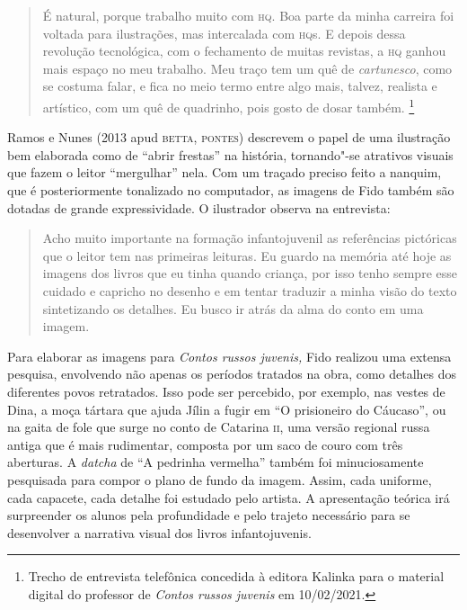 \documentclass[11pt]{extarticle}
\begin{document}
\begin{quote}
É natural, porque trabalho muito com \textsc{hq}. Boa parte da minha carreira foi
voltada para ilustrações, mas intercalada com \textsc{hq}s. E depois dessa
revolução tecnológica, com o fechamento de muitas revistas, a \textsc{hq} ganhou
mais espaço no meu trabalho. Meu traço tem um quê de \emph{cartunesco},
como se costuma falar, e fica no meio termo entre algo mais, talvez,
realista e artístico, com um quê de quadrinho, pois gosto de dosar
também. \footnote{Trecho de entrevista telefônica concedida à editora Kalinka para o material digital do professor de \emph{Contos russos juvenis} em 10/02/2021.} \end{quote}

Ramos e Nunes (2013 apud \textsc{betta}, \textsc{pontes}) descrevem o papel de uma
ilustração bem elaborada como de ``abrir frestas'' na história,
tornando"-se atrativos visuais que fazem o leitor ``mergulhar'' nela. Com
um traçado preciso feito a nanquim, que é posteriormente tonalizado no
computador, as imagens de Fido também são dotadas de grande
expressividade. O ilustrador observa na entrevista:

\begin{quote}
Acho muito importante na formação infantojuvenil as referências
pictóricas que o leitor tem nas primeiras leituras. Eu guardo na memória
até hoje as imagens dos livros que eu tinha quando criança, por isso
tenho sempre esse cuidado e capricho no desenho e em tentar traduzir a
minha visão do texto sintetizando os detalhes. Eu busco ir atrás da alma
do conto em uma imagem.\end{quote}

Para elaborar as imagens para \emph{Contos russos juvenis,} Fido
realizou uma extensa pesquisa, envolvendo não apenas os períodos
tratados na obra, como detalhes dos diferentes povos retratados. Isso
pode ser percebido, por exemplo, nas vestes de Dina, a moça tártara que
ajuda Jílin a fugir em ``O prisioneiro do Cáucaso'', ou na gaita
de fole que surge no conto de Catarina \textsc{ii}, uma versão regional russa
antiga que é mais rudimentar, composta por um saco de couro com três
aberturas. A \emph{datcha} de ``A pedrinha vermelha'' também foi
minuciosamente pesquisada para compor o plano de fundo da imagem. Assim,
cada uniforme, cada capacete, cada detalhe foi estudado pelo artista. A
apresentação teórica irá surpreender os alunos pela profundidade e pelo
trajeto necessário para se desenvolver a narrativa visual dos livros
infantojuvenis.
\end{document}
